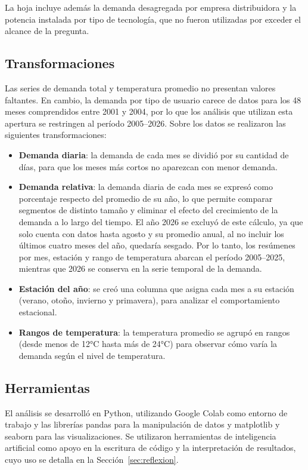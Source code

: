 \documentclass[10pt,a4paper]{article}
\begin{document}
La hoja incluye además la demanda desagregada por empresa distribuidora y la potencia instalada por tipo de tecnología, que no fueron utilizadas por exceder el alcance de la pregunta.

\subsection{Transformaciones}
Las series de demanda total y temperatura promedio no presentan valores faltantes. En cambio, la demanda por tipo de usuario carece de datos para los 48 meses comprendidos entre 2001 y 2004, por lo que los análisis que utilizan esta apertura se restringen al período 2005--2026. Sobre los datos se realizaron las siguientes transformaciones:

\begin{itemize}
  \item \textbf{Demanda diaria}: la demanda de cada mes se dividió por su cantidad de días, para que los meses más cortos no aparezcan con menor demanda.
  \item \textbf{Demanda relativa}: la demanda diaria de cada mes se expresó como porcentaje respecto del promedio de su año, lo que permite comparar segmentos de distinto tamaño y eliminar el efecto del crecimiento de la demanda a lo largo del tiempo. El año 2026 se excluyó de este cálculo, ya que solo cuenta con datos hasta agosto y su promedio anual, al no incluir los últimos cuatro meses del año, quedaría sesgado. Por lo tanto, los resúmenes por mes, estación y rango de temperatura abarcan el período 2005--2025, mientras que 2026 se conserva en la serie temporal de la demanda.
  \item \textbf{Estación del año}: se creó una columna que asigna cada mes a su estación (verano, otoño, invierno y primavera), para analizar el comportamiento estacional.
  \item \textbf{Rangos de temperatura}: la temperatura promedio se agrupó en rangos (desde menos de 12°C hasta más de 24°C) para observar cómo varía la demanda según el nivel de temperatura.
\end{itemize}

\subsection{Herramientas}
El análisis se desarrolló en Python, utilizando Google Colab como entorno de trabajo y las librerías pandas para la manipulación de datos y matplotlib y seaborn para las visualizaciones. Se utilizaron herramientas de inteligencia artificial como apoyo en la escritura de código y la interpretación de resultados, cuyo uso se detalla en la Sección~\ref{sec:reflexion}.
\end{document}
